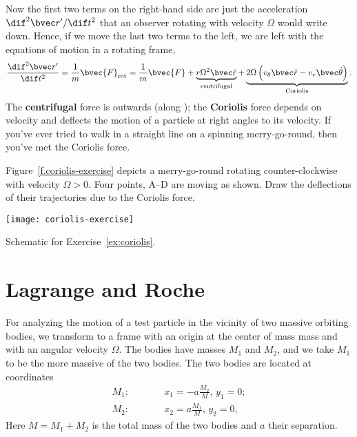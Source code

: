 Now the first two terms on the right-hand side are just the acceleration $\dif^{2}\rv'/\dif t^{2}$ that an observer rotating with velocity $\Omega$ would write down.  Hence, if we move the last two terms to the left, we are left with the equations of motion in a rotating frame,
\begin{equation}\label{e.motion-rotating}
\DDtt{\rv'} = \frac{1}{m}\bvec{F}_{\mathrm{rot}} = \frac{1}{m}\bvec{F} 
	+  \underbrace{r\Omega^{2}\rhat}_{\textrm{centrifugal}}
	+	\underbrace{2\Omega\left(v_{\theta}\rhat - v_{r}\thetahat \right)}_{\textrm{Coriolis}}.
\end{equation}
The \textbf{centrifugal} force is outwards (along \rhat); the \textbf{Coriolis} force depends on velocity and deflects the motion of a particle at right angles to its velocity.  If you've ever tried to walk in a straight line on a spinning merry-go-round, then you've met the Coriolis force.

\begin{exercisebox}
\label{ex:coriolis}
Figure~\ref{f.coriolis-exercise} depicts a merry-go-round rotating counter-clockwise with velocity $\Omega > 0$.  Four points, A--D are moving as shown.  Draw the deflections of their trajectories due to the Coriolis force.
\end{exercisebox}
\begin{marginfigure}
\texttt{[image: coriolis-exercise]}
\caption[Movement on a merry-go-round]{Schematic for Exercise~\ref{ex:coriolis}.
\label{f.coriolis-exercise}}
\end{marginfigure}

\section{Lagrange and Roche}
For analyzing the motion of a test particle in the vicinity of two massive orbiting bodies, we transform to a frame with an origin at the center of mass mass and with an angular velocity $\Omega$.  The bodies have masses $M_{1}$ and $M_{2}$, and we take $M_{1}$ to be the more massive of the two bodies.  The two bodies are located at coordinates
\begin{eqnarray}
	M_{1}:&\qquad& x_{1} = -a\frac{M_{2}}{M},\,y_{1} = 0;\\
	M_{2}:&\qquad& x_{2} = a\frac{M_{1}}{M},\,y_{2} = 0,
\end{eqnarray}
Here $M = M_{1}+M_{2}$ is the total mass of the two bodies and $a$ their separation.

